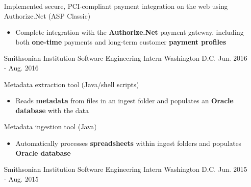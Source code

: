 \begin{cventries}
{\begin{cvitems}
\begin{itemize}
			\end{itemize}
		\item{Implemented secure, PCI-compliant payment integration on the web using Authorize.Net (ASP Classic)}
			\begin{itemize}
				\item{Complete integration with the \textbf{Authorize.Net} payment gateway, including both \textbf{one-time} payments and long-term customer \textbf{payment profiles}}
			\end{itemize}
        \end{cvitems}
    }
    \cventry
    {Smithsonian Institution}
    {Software Engineering Intern}
    {Washington D.C.}
    {Jun. 2016 - Aug. 2016}
    {
        \begin{cvitems}
		\item{Metadata extraction tool (Java/shell scripts)}
        \begin{itemize}
			\item{Reads \textbf{metadata} from files in an ingest folder and populates an \textbf{Oracle database} with the data}
        \end{itemize}
		\item{Metadata ingestion tool (Java)}
        \begin{itemize}
			\item{Automatically processes \textbf{spreadsheets} within ingest folders and populates \textbf{Oracle database}}
        \end{itemize}
        \end{cvitems}
    }
    \cventry
    {Smithsonian Institution}
    {Software Engineering Intern}
    {Washington D.C.}
    {Jun. 2015 - Aug. 2015}
    {
      \begin{cvitems}

\end{cvitems}}
\end{cventries}
